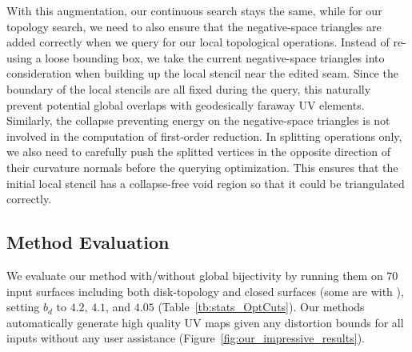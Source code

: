 With this augmentation, our continuous search stays the same, while for our topology search, we need to also ensure that the negative-space triangles are added correctly when we query for our local topological operations.
Instead of re-using a loose bounding box, we take the current negative-space triangles into consideration when building up the local stencil near the edited seam. Since the boundary of the local stencils are all fixed during the query, this naturally prevent potential global overlaps with geodesically faraway UV elements. Similarly, the collapse preventing energy on the negative-space triangles is not involved in the computation of first-order reduction.
In splitting operations only, we also need to carefully push the splitted vertices in the opposite direction of their curvature normals before the querying optimization. This ensures that the initial local stencil has a collapse-free void region so that it could be triangulated correctly.



\subsection{Method Evaluation}

We evaluate our method with/without global bijectivity by running them on 70 input surfaces including both disk-topology and closed surfaces (some are with ), setting $b_d$ to $4.2$, $4.1$, and $4.05$ (Table~\ref{tb:stats_OptCuts}). Our methods automatically generate high quality UV maps given any distortion bounds for all inputs without any user assistance (Figure~\ref{fig:our_impressive_results}).

